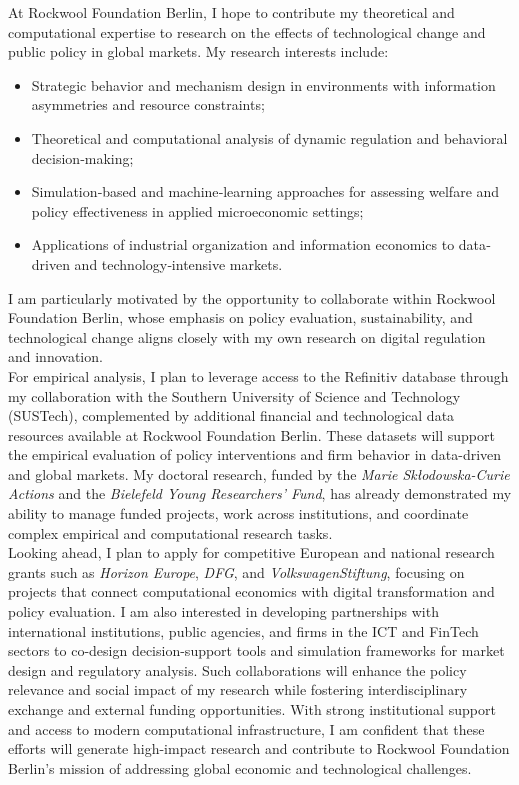 \documentclass{nfr}
\begin{document}
At Rockwool Foundation Berlin, I hope to contribute my theoretical and computational expertise to research on the effects of technological change and public policy in global markets. 
My research interests include:
\begin{itemize}
    \item Strategic behavior and mechanism design in environments with information asymmetries and resource constraints;
    \item Theoretical and computational analysis of dynamic regulation and behavioral decision‐making;
    \item Simulation‐based and machine‐learning approaches for assessing welfare and policy effectiveness in applied microeconomic settings;
    \item Applications of industrial organization and information economics to data‐driven and technology‐intensive markets.
\end{itemize}
I am particularly motivated by the opportunity to collaborate within Rockwool Foundation Berlin, whose emphasis on policy evaluation, sustainability, and technological change aligns closely with my own research on digital regulation and innovation.\\

For empirical analysis, I plan to leverage access to the Refinitiv database through my collaboration with the Southern University of Science and Technology (SUSTech), complemented by additional financial and technological data resources available at Rockwool Foundation Berlin. 
These datasets will support the empirical evaluation of policy interventions and firm behavior in data-driven and global markets. 
My doctoral research, funded by the \textit{Marie Skłodowska-Curie Actions} and the \textit{Bielefeld Young Researchers’ Fund}, has already demonstrated my ability to manage funded projects, work across institutions, and coordinate complex empirical and computational research tasks.\\

Looking ahead, I plan to apply for competitive European and national research grants such as \textit{Horizon Europe}, \textit{DFG}, and \textit{VolkswagenStiftung}, focusing on projects that connect computational economics with digital transformation and policy evaluation. 
I am also interested in developing partnerships with international institutions, public agencies, and firms in the ICT and FinTech sectors to co-design decision-support tools and simulation frameworks for market design and regulatory analysis. 
Such collaborations will enhance the policy relevance and social impact of my research while fostering interdisciplinary exchange and external funding opportunities. 
With strong institutional support and access to modern computational infrastructure, I am confident that these efforts will generate high-impact research and contribute to Rockwool Foundation Berlin’s mission of addressing global economic and technological challenges.\\
\end{document}

